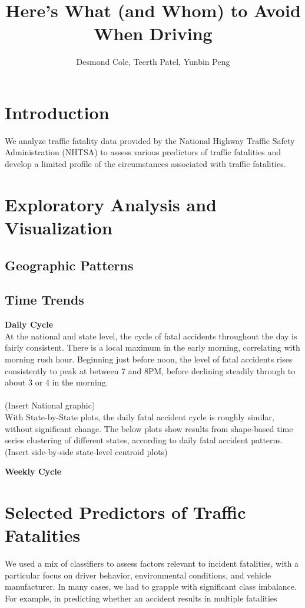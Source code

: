 \documentclass[11pt, oneside]{article}   	%
\title{Here's What (and Whom) to Avoid When Driving}
\author{Desmond Cole, Teerth Patel, Yunbin Peng}
\begin{document}
\maketitle
\section*{Introduction}
We analyze traffic fatality data provided by the National Highway Traffic Safety Administration (NHTSA) to assess various predictors of traffic fatalities and develop a limited profile of the circumstances associated with traffic fatalities.

\section*{Exploratory Analysis and Visualization}

\subsection*{Geographic Patterns}

\subsection*{Time Trends}
\textbf{Daily Cycle} \\
At the national and state level, the cycle of fatal accidents throughout the day is fairly consistent. There is a local maximum in the early morning, correlating with morning rush hour. Beginning just before noon, the level of fatal accidents rises consistently to peak at between 7 and 8PM, before declining steadily through to about 3 or 4 in the morning. \\
\\
(Insert National graphic)
\\

With State-by-State plots, the daily fatal accident cycle is roughly similar, without significant change. The below plots show results from shape-based time series clustering of different states, according to daily fatal accident patterns. \\

(Insert side-by-side state-level centroid plots)

\textbf{Weekly Cycle} \\

\section*{Selected Predictors of Traffic Fatalities}
We used a mix of classifiers to assess factors relevant to incident fatalities, with a particular focus on driver behavior, environmental conditions, and vehicle manufacturer. In many cases, we had to grapple with significant class imbalance. For example, in predicting whether an accident results in multiple fatalities
\end{document}
